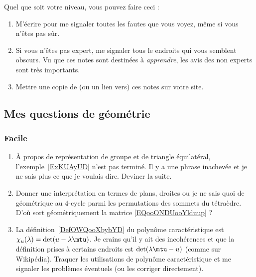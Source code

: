 Quel que soit votre niveau, vous pouvez faire ceci :

\begin{enumerate}
    \item
        M'écrire pour me signaler toutes les fautes que vous voyez, même si vous n'êtes pas sûr.
    \item
        Si vous n'êtes pas expert, me signaler tous le endroits qui vous semblent obscurs. Vu que ces notes sont destinées à \emph{apprendre}, les avis des non experts sont très importants.
    \item
        Mettre une copie de (ou un lien vers) ces notes sur votre site.
\end{enumerate}

\subsection{Mes questions de géométrie}

\subsubsection{Facile}

\begin{enumerate}
    \item
        À propos de représentation de groupe et de triangle équilatéral, l'exemple~\ref{ExKUAyUD} n'est pas terminé. Il y a une phrase inachevée et je ne sais plus ce que je voulais dire. Deviner la suite.
    \item
        Donner une interprétation en termes de plans, droites ou je ne sais quoi de géométrique au \( 4\)-cycle parmi les permutations des sommets du tétraèdre. D'où sort géométriquement la matrice \eqref{EQooONDUooYlduup} ?
    \item
        La définition~\ref{DefOWQooXbybYD} du polynôme caractéristique est \( \chi_u(\lambda)=\det(u-\lambda \mtu)\). Je crains qu'il y ait des incohérences et que la définition prises à certains endroits est \( \det(\lambda\mtu-u)\) (comme sur Wikipédia). Traquer les utilisations de polynôme caractéristique et me signaler les problèmes éventuels (ou les corriger directement).
\end{enumerate}


